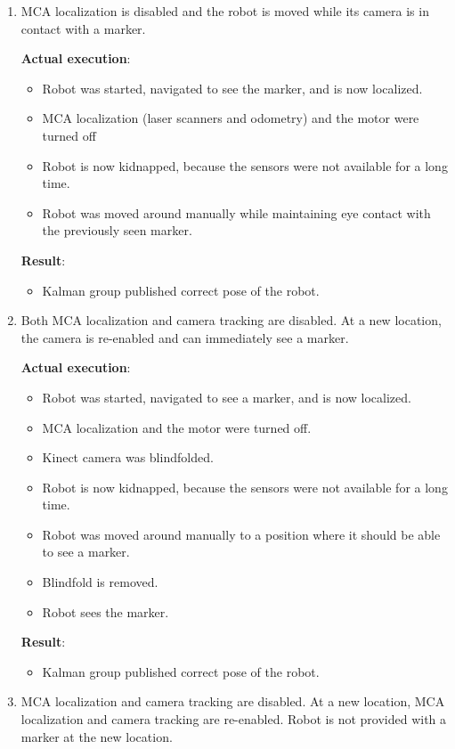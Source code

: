 \begin{enumerate}
\item MCA localization is disabled and the robot is moved while its camera is in contact with a marker.

\textbf{Actual execution}:
\begin{itemize}
\item Robot was started, navigated to see the marker, and is now localized.
\item MCA localization (laser scanners and odometry) and the motor were turned off
\item Robot is now kidnapped, because the sensors were not available for a long time.
\item Robot was moved around manually while maintaining eye contact with the previously seen marker.
\end{itemize}

\textbf{Result}:
\begin{itemize}
\item Kalman group published correct pose of the robot.
\end{itemize}


\item Both MCA localization and camera tracking are disabled. At a new location, the camera is re-enabled and can immediately see a marker.

\textbf{Actual execution}:
\begin{itemize}
\item Robot was started, navigated to see a marker, and is now localized.
\item MCA localization and the motor were turned off. 
\item Kinect camera was blindfolded.
\item Robot is now kidnapped, because the sensors were not available for a long time.
\item Robot was moved around manually to a position where it should be able to see a marker.
\item Blindfold is removed.
\item Robot sees the marker.
\end{itemize} 

\textbf{Result}:
\begin{itemize}
\item Kalman group published correct pose of the robot.
\end{itemize}

\item MCA localization and camera tracking are disabled. At a new location, MCA localization and camera tracking are re-enabled. Robot is not provided with a marker at the new location. 


\end{enumerate}
